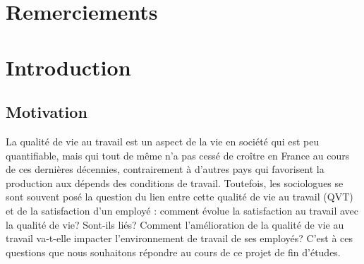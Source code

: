 \documentclass[11pt,fleqn,a4paper,openany,frenchb]{book} %
\begin{document}

\pagestyle{empty} %

\tableofcontents %


\pagestyle{fancy} %
\chapter*{Remerciements}




\chapter{Introduction}

\section{Motivation}

La qualité de vie au travail est un aspect de la vie en société qui est peu quantifiable, mais qui tout de même n'a pas cessé de croître en France au cours de ces dernières décennies, contrairement à d'autres pays qui favorisent la production aux dépends des conditions de travail. Toutefois, les sociologues se sont souvent posé la question du lien entre cette qualité de vie au travail (QVT) et de la satisfaction d'un employé : comment évolue la satisfaction au travail avec la qualité de vie? Sont-ils liés? Comment l'amélioration de la qualité de vie au travail va-t-elle impacter l'environnement de travail de ses employés? C'est à ces questions que nous souhaitons répondre au cours de ce projet de fin d'études.\par
\end{document}
